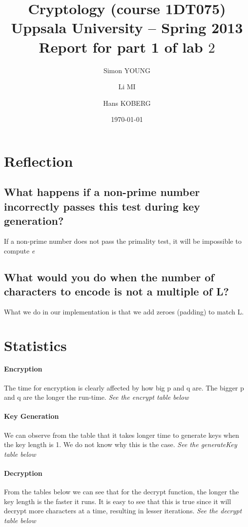 \documentclass[a4paper,11pt]{article}
\title{\textbf{Cryptology (course 1DT075) \\ 
    Uppsala University -- Spring 2013 \\
    Report for part 1 of lab $2$
  }
}
\author{Simon YOUNG \and Li MI \and Hans KOBERG} %
\date{\today}
\begin{document}
\maketitle

\section{Reflection}

\subsection{What happens if a non-prime number incorrectly passes this test during key generation?}
If a non-prime number does not pass the primality test, it will be impossible to compute \emph{e}

\subsection{What would you do when the number of characters to encode is not a multiple of L?}
What we do in our implementation is that we add zeroes (padding) to match L. 

\section{Statistics}

\paragraph{Encryption} The time for encryption is clearly affected by how big p and q are. The bigger p and q are the longer the run-time. 
\emph{See the encrypt table below}

\paragraph{Key Generation}
We can observe from the table that it takes longer time to generate keys when the key length is 1. We do not know why this is the case.
\emph{See the generateKey table below}
\paragraph{Decryption}
From the tables below we can see that for the decrypt function, the longer the key length is the faster it runs. It is easy to see that this is true since it will decrypt more characters at a time, resulting in lesser iterations. \emph{See the decrypt table below}
\end{document}
